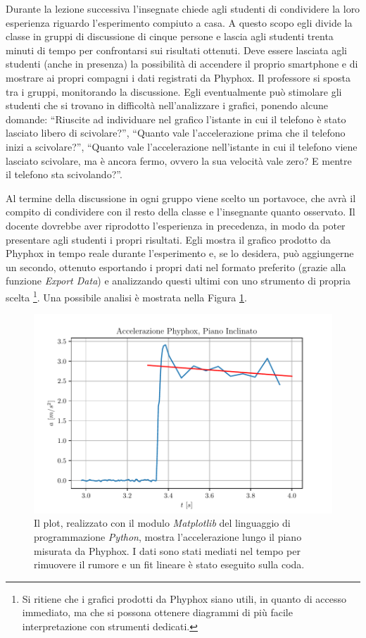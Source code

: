 \documentclass{report} \usepackage[T1]{fontenc} \usepackage[italian]{babel}
\begin{document}
Durante la lezione successiva l'insegnate chiede agli studenti
di condividere la loro esperienza riguardo l'esperimento
compiuto a casa.
A questo scopo egli divide la classe in gruppi di
discussione di cinque persone e lascia agli studenti trenta
minuti di tempo per confrontarsi sui risultati ottenuti.
Deve essere lasciata agli studenti (anche in presenza)
la possibilità di accendere il proprio smartphone e di
mostrare ai propri compagni i dati registrati da
Phyphox.
Il professore si sposta tra i gruppi, monitorando
la discussione.
Egli eventualmente può stimolare gli studenti che si trovano
in difficoltà nell'analizzare i grafici, ponendo
alcune domande: ``Riuscite ad individuare nel grafico l'istante
in cui il telefono è stato lasciato libero di scivolare?'',
``Quanto vale l'accelerazione prima che il telefono inizi a
scivolare?'', ``Quanto vale l'accelerazione nell'istante
in cui il telefono viene lasciato scivolare, ma è ancora fermo,
ovvero la sua velocità vale zero? E mentre il telefono sta
scivolando?''.

Al termine della discussione in ogni gruppo viene scelto
un portavoce, che avrà il compito di condividere
con il resto della classe e l'insegnante quanto osservato.
Il docente dovrebbe aver riprodotto l'esperienza in precedenza,
in modo da poter presentare agli studenti i propri risultati.
Egli mostra il grafico prodotto da
Phyphox in tempo reale durante l'esperimento e, se lo desidera,
può aggiungerne un secondo, ottenuto
esportando i propri dati nel formato preferito (grazie alla funzione
\emph{Export Data}) e analizzando questi ultimi con uno strumento di propria
scelta
\footnote{
          Si ritiene che i grafici prodotti da Phyphox siano utili,
          in quanto di accesso immediato, ma che si possona ottenere
          diagrammi di più facile interpretazione con strumenti
          dedicati.
         }.
Una possibile analisi è mostrata nella Figura \ref{fig:a_phyphox}.
\begin{figure}[H]
\centering
  \includegraphics[width=\textwidth]{a_phyphox}
  \caption{Il plot, realizzato con il modulo \emph{Matplotlib}
           del linguaggio di programmazione \emph{Python},
           mostra l'accelerazione lungo il piano misurata da
           Phyphox. I dati sono stati mediati nel tempo
           per rimuovere il rumore e un fit lineare è stato
           eseguito sulla coda.
          }
  \label{fig:a_phyphox}
\end{figure}
\end{document}
